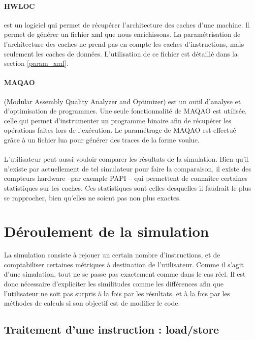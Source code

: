 \paragraph{HWLOC} est un logiciel qui permet de récupérer l'architecture des caches d'une machine. Il permet de générer un fichier xml que nous enrichissons. La paramétrisation de l'architecture des caches ne prend pas en compte les caches d'instructions, mais seulement les caches de données. L'utilisation de ce fichier est détaillé dans la section \ref{param_xml}.

\paragraph{MAQAO} (Modular Assembly Quality Analyzer and Optimizer) est un outil d'analyse et d'optimisation de programmes. Une seule fonctionnalité de \textsf{MAQAO} est utilisée, celle qui permet d'instrumenter un programme binaire afin de récupérer les opérations faites lors de l'exécution. Le paramétrage de \textsf{MAQAO} est effectué grâce à un fichier lua pour générer des traces de la forme voulue.

\paragraph{}
L'utilisateur peut aussi vouloir comparer les résultats de la simulation. Bien qu'il n'existe par actuellement de tel simulateur pour faire la comparaison, il existe des compteurs hardware --par exemple \textsf{PAPI} -- qui permettent de connaître certaines statistiques sur les caches. Ces statistiques sont celles desquelles il faudrait le plus se rapprocher, bien qu'elles ne soient pas non plus exactes.


\section{Déroulement de la simulation}

La simulation consiste à rejouer un certain nombre d'instructions, et de comptabiliser certaines métriques à destination de l'utilisateur. Comme il s'agit d'une simulation, tout ne se passe pas exactement comme dans le cas réel. Il est donc nécessaire d'expliciter les similitudes comme les différences afin que l'utilisateur ne soit pas surpris à la fois par les résultats, et à la fois par les méthodes de calculs si son objectif est de modifier le code.

\subsection{Traitement d'une instruction : load/store}

